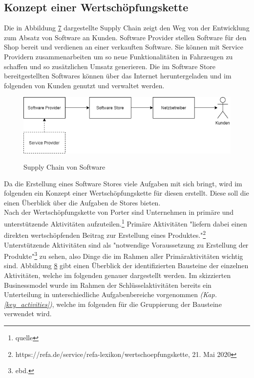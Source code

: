 \subsection{Konzept einer Wertschöpfungskette}\label{wsk}
Die in Abbildung \hyperref[img:supplychain]{7} dargestellte Supply Chain zeigt den Weg von der Entwicklung zum Absatz von Software an Kunden. Software Provider stellen Software für den Shop bereit und verdienen an einer verkauften Software. Sie können mit Service Providern zusammenarbeiten um so neue Funktionalitäten in Fahrzeugen zu schaffen und so zusätzlichen Umsatz generieren. Die im Software Store bereitgestellten Softwares können über das Internet heruntergeladen und im folgenden von Kunden genutzt und verwaltet werden.
\begin{figure}[!h]
	\centering
	\includegraphics[width=0.8\columnwidth]{pictures/supplychain.png}
	\label{img:supplychain}
	\caption{Supply Chain von Software}
\end{figure}
Da die Erstellung eines Software Stores viele Aufgaben mit sich bringt, wird im folgenden ein Konzept einer Wertschöpfungskette für diesen erstellt. Diese soll die einen Überblick über die Aufgaben de Stores bieten.\\
Nach der Wertschöpfungskette von Porter sind Unternehmen in primäre und unterstützende Aktivitäten aufzuteilen.\footnote{quelle} Primäre Aktivitäten "liefern dabei einen direkten wertschöpfenden Beitrag zur Erstellung eines Produktes."\footnote{https://refa.de/service/refa-lexikon/wertschoepfungskette, 21. Mai 2020} Unterstützende Aktivitäten sind als "notwendige Voraussetzung zu Erstellung der Produkte"\footnote{ebd.} zu sehen, also Dinge die im Rahmen aller Primäraktivitäten wichtig sind. Abbildung \hyperref[img:wsk]{8} gibt einen Überblick der identifizierten Bausteine der einzelnen Aktivitäten, welche im folgenden genauer dargestellt werden. Im skizzierten Businessmodel wurde im Rahmen der Schlüsselaktivitäten bereits ein Unterteilung in unterschiedliche Aufgabenbereiche vorgenommen \textit{(Kap. \ref{key_activities})}, welche im folgenden für die Gruppierung der Bausteine verwendet wird.
